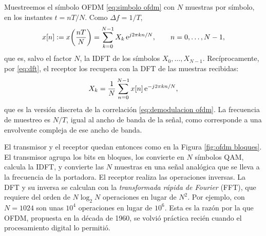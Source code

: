 Muestreemos el símbolo OFDM \eqref{eq:simbolo ofdm} con $N$ muestras por símbolo, en los instantes $t=nT/N$. Como $\Delta f=1/T$,
\begin{equation}\label{eq:ofdm idft}
    x[n] := x\!\left(\frac{nT}{N}\right) = \sum_{k=0}^{N-1} X_k\,\mathrm{e}^{j2\pi kn/N}, \qquad n=0,\ldots,N-1,
\end{equation}
que es, salvo el factor $N$, la IDFT de los símbolos $X_0,\ldots,X_{N-1}$. Recíprocamente, por \eqref{eq:dft}, el receptor los recupera con la DFT de las muestras recibidas:
\begin{equation}\label{eq:ofdm dft}
    X_k = \frac{1}{N}\sum_{n=0}^{N-1} x[n]\,\mathrm{e}^{-j2\pi kn/N},
\end{equation}
que es la versión discreta de la correlación \eqref{eq:demodulacion ofdm}. La frecuencia de muestreo es $N/T$, igual al ancho de banda de la señal, como corresponde a una envolvente compleja de ese ancho de banda.

El transmisor y el receptor quedan entonces como en la Figura \ref{fig:ofdm bloques}. El transmisor agrupa los bits en bloques, los convierte en $N$ símbolos QAM, calcula la IDFT, y convierte las $N$ muestras en una señal analógica que se lleva a la frecuencia de la portadora. El receptor realiza las operaciones inversas. La DFT y su inversa se calculan con la \emph{transformada rápida de Fourier} (FFT), que requiere del orden de $N\log_2 N$ operaciones en lugar de $N^2$. Por ejemplo, con $N=1024$ son unas $10^4$ operaciones en lugar de $10^6$. Esta es la razón por la que OFDM, propuesta en la década de 1960, se volvió práctica recién cuando el procesamiento digital lo permitió.

